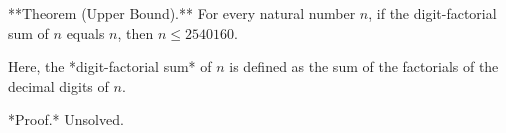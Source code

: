 
**Theorem (Upper Bound).** For every natural number $n$, if the digit-factorial sum of $n$ equals $n$, then $n \leq 2540160$.

Here, the *digit-factorial sum* of $n$ is defined as the sum of the factorials of the decimal digits of $n$.

*Proof.* Unsolved.